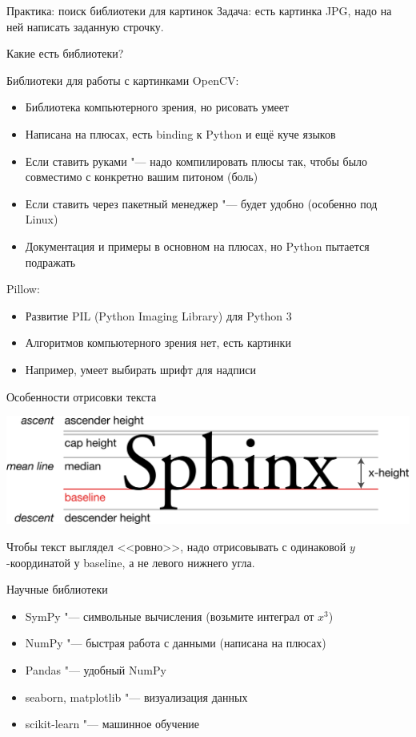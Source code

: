 \begin{frame}[t]{Практика: поиск библиотеки для картинок}
	Задача: есть картинка JPG, надо на ней написать заданную строчку.
	
	Какие есть библиотеки?
\end{frame}

\begin{frame}[t]{Библиотеки для работы с картинками}
	OpenCV:
	\begin{itemize}
	\item Библиотека компьютерного зрения, но рисовать умеет
	\item Написана на плюсах, есть binding к Python и ещё куче языков
	\item Если ставить руками "--- надо компилировать плюсы так,
		чтобы было совместимо с конкретно вашим питоном (боль)
	\item Если ставить через пакетный менеджер "--- будет удобно
		(особенно под Linux)
	\item Документация и примеры в основном на плюсах, но Python пытается подражать
	\end{itemize}
	
	Pillow:
	\begin{itemize}
	\item Развитие PIL (Python Imaging Library) для Python 3
	\item Алгоритмов компьютерного зрения нет, есть картинки
	\item Например, умеет выбирать шрифт для надписи
	\end{itemize}
\end{frame}

\begin{frame}{Особенности отрисовки текста}
	\begin{center}
		\includegraphics[width=\linewidth,keepaspectratio]{typography.png}
	\end{center}
	
	Чтобы текст выглядел <<ровно>>, надо отрисовывать с одинаковой
	$y$-координатой у baseline, а не левого нижнего угла.
\end{frame}

\begin{frame}[t]{Научные библиотеки}
	\begin{itemize}
	\item SymPy "--- символьные вычисления (возьмите интеграл от $x^3$)
	\item NumPy "--- быстрая работа с данными (написана на плюсах)
	\item Pandas "--- удобный NumPy
	\item seaborn, matplotlib "--- визуализация данных
	\item scikit-learn "--- машинное обучение
	\end{itemize}
\end{frame}
